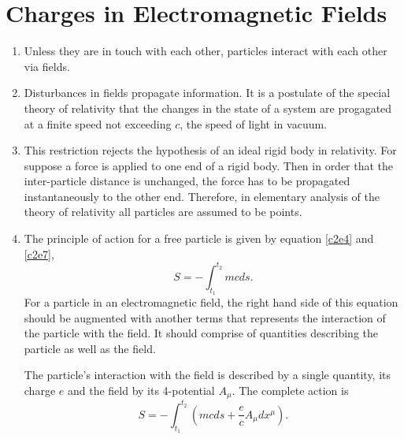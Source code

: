 \chapter{Charges in Electromagnetic Fields}\label{c3}
\begin{enumerate}
\item Unless they are in touch with each other, particles interact with each
other via fields.

\item Disturbances in fields propagate information. It is a postulate of the 
special theory of relativity that the changes in the state of a system are
progagated at a finite speed not exceeding $c$, the speed of light in vacuum.

\item This restriction rejects the hypothesis of an ideal rigid body in relativity.
For suppose a force is applied to one end of a rigid body. Then in order that the
inter-particle distance is unchanged, the force has to be propagated instantaneously
to the other end. Therefore, in elementary analysis of the theory of relativity
all particles are assumed to be points.

\item The principle of action for a free particle is given by equation \eqref{c2e4}
and \eqref{c2e7},
\begin{equation}\label{c3e1}
S = -\int_{t_1}^{t_2}mcds.
\end{equation}
For a particle in an electromagnetic field, the right hand side of this equation
should be augmented with another terms that represents the interaction of the
particle with the field. It should comprise of quantities describing the particle
as well as the field.

The particle's interaction with the field is described by a single quantity, its
charge $e$ and the field by its 4-potential $A_\mu$. The complete action is
\begin{equation}\label{c3e2}
S = -\int_{t_1}^{t_2} \left(mcds + \frac{e}{c}A_\mu dx^\mu\right).
\end{equation}


\end{enumerate}
